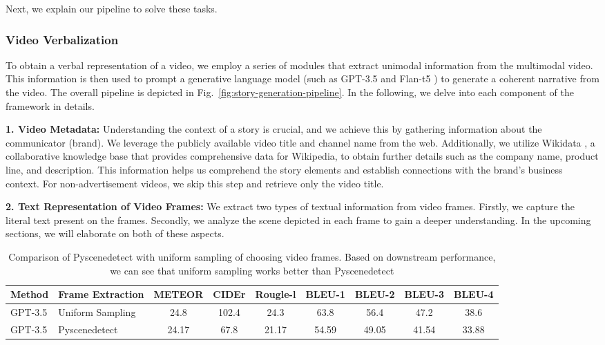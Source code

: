 \documentclass[hidelinks,11pt,a4paper]{report}
\renewcommand{\cite}[1]{\citep{#1}}
\begin{document}
Next, we explain our pipeline to solve these tasks.

\subsubsection{Video Verbalization} 
To obtain a verbal representation of a video, we employ a series of modules that extract unimodal information from the multimodal video. This information is then used to prompt a generative language model (such as GPT-3.5 \cite{brown2020language} and Flan-t5 \cite{chung2022scaling}) to generate a coherent narrative from the video. The overall pipeline is depicted in Fig.~\ref{fig:story-generation-pipeline}. In the following, we delve into each component of the framework in details.

\noindent \textbf{1. Video Metadata:} Understanding the context of a story is crucial, and we achieve this by gathering information about the communicator (brand). We leverage the publicly available video title and channel name from the web. Additionally, we utilize Wikidata \cite{10.1145/2629489}, a collaborative knowledge base that provides comprehensive data for Wikipedia, to obtain further details such as the company name, product line, and description. This information helps us comprehend the story elements and establish connections with the brand's business context. For non-advertisement videos, we skip this step and retrieve only the video title.

\noindent \textbf{2. Text Representation of Video Frames:} We extract two types of textual information from video frames. Firstly, we capture the literal text present on the frames. Secondly, we analyze the scene depicted in each frame to gain a deeper understanding. In the upcoming sections, we will elaborate on both of these aspects.


\begin{table}[!h]\centering
\begin{adjustbox}{max width = 0.9\textwidth}
\begin{tabular}{llccccccc}\toprule[1.5pt]
\textbf{Method} &\textbf{Frame Extraction} &\textbf{METEOR} & \textbf{CIDEr} &\textbf{Rougle-l} &\textbf{BLEU-1}&\textbf{BLEU-2}&\textbf{BLEU-3}&\textbf{BLEU-4}\\\toprule[0.5pt]
GPT-3.5 & Uniform Sampling & 24.8 & 102.4 & 24.3 & 63.8 & 56.4 & 47.2 & 38.6 \\
GPT-3.5 & Pyscenedetect & 24.17 & 67.8 & 21.17 & 54.59 & 49.05 & 41.54 & 33.88 \\\bottomrule[1.5pt]
\end{tabular}
\end{adjustbox}
\caption{Comparison of Pyscenedetect \cite{breakthrough-pyscenedetect} with uniform sampling of choosing video frames. Based on downstream performance, we can see that uniform sampling works better than Pyscenedetect  \label{tab:ablation-sampling}}
\end{table}
\end{document}
